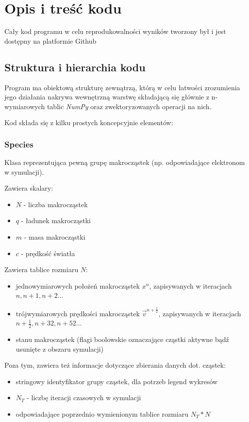 \section{Opis i treść kodu} %
Cały kod programu w celu reprodukowalności wyników tworzony był i jest dostępny na platformie Github %

\subsection{Struktura i hierarchia kodu}

Program ma obiektową strukturę zewnątrzą, którą w celu łatwości zrozumienia jego działania nakrywa wewnętrzną warstwę
składającą się głównie z n-wymiarowych tablic \emph{NumPy} oraz zwektoryzowanych operacji na nich.

Kod składa się z kilku prostych koncepcyjnie elementów:

\subsubsection{Species}
Klasa reprezentująca pewną grupę makrocząstek (np. odpowiadające elektronom w symulacji).

Zawiera skalary:
\begin{itemize}
\item $N$ - liczba makrocząstek
\item $q$ - ładunek makrocząstki
\item $m$ - masa makrocząstki
\item $c$ - prędkość światła
\end{itemize}

Zawiera tablice rozmiaru $N$:
\begin{itemize}
\item jednowymiarowych położeń makrocząstek $x^n$, zapisywanych w iteracjach $n, n+1, n+2$...
\item trójwymiarowych prędkości makrocząstek $\vec{v}^{n+\frac{1}{2}}$, zapisywanych w iteracjach $n+\frac{1}{2}, n+{3}{2}, n+{5}{2}$...
\item stanu makrocząstek (flagi boolowskie oznaczające cząstki aktywne bądź usunięte z obszaru symulacji)
\end{itemize}

Poza tym, zawiera też informacje dotyczące zbierania danych dot. cząstek:
\begin{itemize}
    \item stringowy identyfikator grupy cząstek, dla potrzeb legend wykresów
    \item $N_T$ - liczbę iteracji czasowych w symulacji
    \item odpowiadające poprzednio wymienionym tablice rozmiaru $N_T * N$
\end{itemize}

